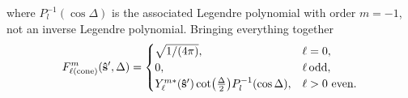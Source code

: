 \documentclass[]{osa-article}
\let\originalleft\left
\let\originalright\right
\renewcommand{\left}{\mathopen{}\mathclose\bgroup\originalleft}
\renewcommand{\right}{\aftergroup\egroup\originalright}
\providecommand{\mh}[1]{\mathbf{\hat{#1}}}
\begin{document}
where $P_l^{-1}(\cos\Delta)$ is the associated Legendre polynomial with order
$m=-1$, not an inverse Legendre polynomial. Bringing everything together
\begin{align}
  F_{\ell\text{(cone)}}^m(\mh{s}', \Delta) =
  \begin{cases}
    \sqrt{1/(4\pi)}, & \ell = 0,\\
    0, & \ell\, \text{odd},\\
    Y_\ell^{m*}(\mh{s}')\cot\left(\frac{\Delta}{2}\right)P_l^{-1}(\cos\Delta), & \ell > 0\,\, \text{even}.
  \end{cases}
\end{align}
\end{document}
